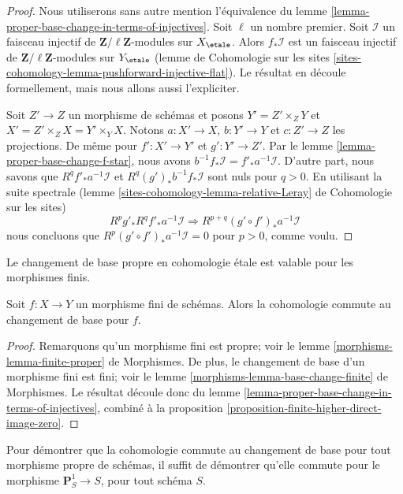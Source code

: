 \begin{proof}
Nous utiliserons sans autre mention l'équivalence du
lemme \ref{lemma-proper-base-change-in-terms-of-injectives}.
Soit $\ell$ un nombre premier.
Soit $\mathcal{I}$ un faisceau injectif de
$\mathbf{Z}/\ell\mathbf{Z}$-modules sur $X_\etale$.
Alors $f_*\mathcal{I}$ est un faisceau injectif de
$\mathbf{Z}/\ell\mathbf{Z}$-modules sur $Y_\etale$
(lemme de Cohomologie sur les sites
\ref{sites-cohomology-lemma-pushforward-injective-flat}).
Le résultat en découle formellement, mais nous allons aussi
l'expliciter.

\medskip\noindent
Soit $Z' \to Z$ un morphisme de schémas et posons
$Y' = Z' \times_Z Y$ et $X' = Z' \times_Z X = Y' \times_ Y X$.
Notons $a : X' \to X$, $b : Y' \to Y$ et $c : Z' \to Z$ les
projections. De même pour $f' : X' \to Y'$ et $g' : Y' \to Z'$.
Par le lemme \ref{lemma-proper-base-change-f-star}, nous avons
$b^{-1}f_*\mathcal{I} = f'_*a^{-1}\mathcal{I}$.
D'autre part, nous savons que $R^qf'_*a^{-1}\mathcal{I}$ et
$R^q(g')_*b^{-1}f_*\mathcal{I}$ sont nuls pour $q > 0$.
En utilisant la suite spectrale
(lemme \ref{sites-cohomology-lemma-relative-Leray} de Cohomologie sur les sites)
$$
R^pg'_* R^qf'_* a^{-1}\mathcal{I} \Rightarrow
R^{p + q}(g' \circ f')_* a^{-1}\mathcal{I}
$$
nous concluons que $R^p(g' \circ f')_*a^{-1}\mathcal{I} = 0$ pour
$p > 0$, comme voulu.
\end{proof}

\begin{lemma}
\label{lemma-finite}
\begin{slogan}
Le changement de base propre en cohomologie étale est valable pour les morphismes finis.
\end{slogan}
Soit $f : X \to Y$ un morphisme fini de schémas.
Alors la cohomologie commute au changement de base pour $f$.
\end{lemma}

\begin{proof}
Remarquons qu'un morphisme fini est propre; voir le
lemme \ref{morphisms-lemma-finite-proper} de Morphismes.
De plus, le changement de base d'un morphisme fini est fini; voir le
lemme \ref{morphisms-lemma-base-change-finite} de Morphismes.
Le résultat découle donc du
lemme \ref{lemma-proper-base-change-in-terms-of-injectives},
combiné à la
proposition \ref{proposition-finite-higher-direct-image-zero}.
\end{proof}

\begin{lemma}
\label{lemma-reduce-to-P1}
Pour démontrer que la cohomologie commute au changement de base pour
tout morphisme propre de schémas, il suffit de démontrer qu'elle
commute pour le morphisme $\mathbf{P}^1_S \to S$, pour tout schéma $S$.
\end{lemma}

